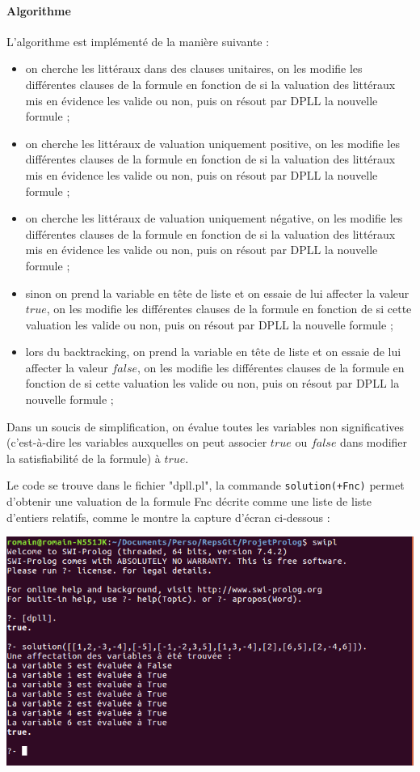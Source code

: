 \documentclass[12pt,a4paper]{article}
\begin{document}
\paragraph{Algorithme} L'algorithme est implémenté de la manière suivante :
\begin{itemize}
\item on cherche les littéraux dans des clauses unitaires, on les modifie les différentes clauses de la formule en fonction de si la valuation des littéraux mis en évidence les valide ou non, puis on résout par DPLL la nouvelle formule ;
\item on cherche les littéraux de valuation uniquement positive, on les modifie les différentes clauses de la formule en fonction de si la valuation des littéraux mis en évidence les valide ou non, puis on résout par DPLL la nouvelle formule ;
\item on cherche les littéraux de valuation uniquement négative, on les modifie les différentes clauses de la formule en fonction de si la valuation des littéraux mis en évidence les valide ou non, puis on résout par DPLL la nouvelle formule ;
\item sinon on prend la variable en tête de liste et on essaie de lui affecter la valeur $true$, on les modifie les différentes clauses de la formule en fonction de si cette valuation les valide ou non, puis on résout par DPLL la nouvelle formule ;
\item lors du backtracking, on prend la variable en tête de liste et on essaie de lui affecter la valeur $false$, on les modifie les différentes clauses de la formule en fonction de si cette valuation les valide ou non, puis on résout par DPLL la nouvelle formule ;
\end{itemize}

Dans un soucis de simplification, on évalue toutes les variables non significatives (c'est-à-dire les variables auxquelles on peut associer $true$ ou $false$ dans modifier la satisfiabilité de la formule) à $true$.


Le code se trouve dans le fichier "dpll.pl", la commande \texttt{solution(+Fnc)} permet d'obtenir une valuation de la formule Fnc décrite comme une liste de liste d'entiers relatifs, comme le montre la capture d'écran ci-dessous :

\begin{center}
\includegraphics[width = 400pt]{SolutionDpll.png}
\end{center}
\end{document}
